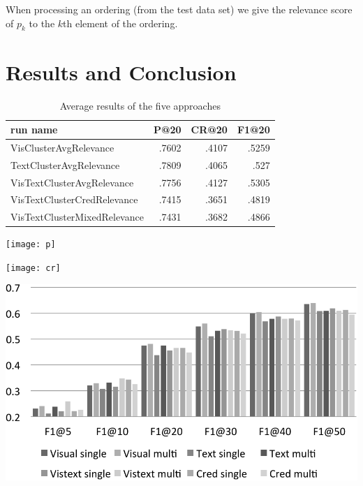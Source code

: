 \documentclass{sig-alternate}
\begin{document}
When processing an ordering (from the test data set) we give the relevance score of $p_k$ to the $k$th element of the ordering.

\section{Results and Conclusion}

\begin{table}[h]
\begin{tabular}{|l|r|r|r|}
	\hline 
	run name & P@20 & CR@20 & F1@20\tabularnewline
	\hline 
	\hline 
	VisClusterAvgRelevance & .7602 & .4107 & .5259\tabularnewline
	\hline 
	TextClusterAvgRelevance & .7809 & .4065 & .527\tabularnewline
	\hline 
	VisTextClusterAvgRelevance & .7756 & .4127 & .5305\tabularnewline
	\hline 
	VisTextClusterCredRelevance & .7415 & .3651 & .4819\tabularnewline
	\hline 
	VisTextClusterMixedRelevance & .7431 & .3682 & .4866\tabularnewline
	\hline 
\end{tabular}
\caption{Average results of the five approaches}
\end{table}

\texttt{[image: p]}

\texttt{[image: cr]}

\includegraphics[width=0.9\linewidth]{f1}




\end{document}
